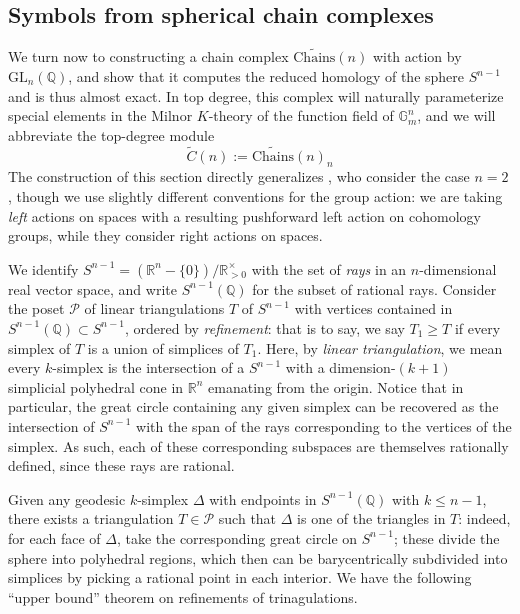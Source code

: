 \documentclass[10pt]{amsart}
\theoremstyle{definition}
\newcommand{\Q}{\mathbb{Q}}
\newcommand{\R}{\mathbb{R}}
\newcommand{\Chains}{\mathrm{Chains}}
\numberwithin{equation}{section}
\begin{document}
    \subsection{Symbols from spherical chain complexes} \label{section:symbols}
    We turn now to constructing a chain complex $\widetilde{\Chains}(n)$ with action by $\mathrm{GL}_n(\mathbb{Q})$, and show that it computes the reduced homology of the sphere $S^{n-1}$ and is thus almost exact. In top degree, this complex will naturally parameterize special elements in the Milnor $K$-theory of the function field of $\mathbb{G}_m^n$, and we will abbreviate the top-degree module
    \[
    \tilde{C}(n) := \widetilde{\Chains}(n)_n
    \]
    The construction of this section directly generalizes \cite[\S5]{SV}, who consider the case $n=2$, though we use slightly different conventions for the group action: we are taking \emph{left} actions on spaces with a resulting pushforward left action on cohomology groups, while they consider right actions on spaces.
    
    We identify $S^{n-1} = (\R^{n}-\{0\})/\R_{>0}^\times$ with the set of \emph{rays} in an $n$-dimensional real vector space, and write $S^{n-1}(\Q)$ for the subset of rational rays. Consider the poset $\mathcal{P}$ of linear triangulations $T$ of $S^{n-1}$ with vertices contained in $S^{n-1}(\mathbb{Q})\subset S^{n-1}$, ordered by \emph{refinement}: that is to say, we say $T_1\ge T$ if every simplex of $T$ is a union of simplices of $T_1$. Here, by \emph{linear triangulation}, we mean every $k$-simplex is the intersection of a $S^{n-1}$ with a dimension-$(k+1)$ simplicial polyhedral cone in $\mathbb{R}^n$ emanating from the origin. Notice that in particular, the great circle containing any given simplex can be recovered as the intersection of $S^{n-1}$ with the span of the rays corresponding to the vertices of the simplex. As such, each of these corresponding subspaces are themselves rationally defined, since these rays are rational.
    
    Given any geodesic $k$-simplex $\Delta$ with endpoints in $S^{n-1}(\mathbb{Q})$ with $k\le n-1$, there exists a triangulation $T\in \mathcal{P}$ such that $\Delta$ is one of the triangles in $T$: indeed, for each face of $\Delta$, take the corresponding great circle on $S^{n-1}$; these divide the sphere into polyhedral regions, which then can be barycentrically subdivided into simplices by picking a rational point in each interior. We have the following ``upper bound'' theorem on refinements of trinagulations.
\end{document}
